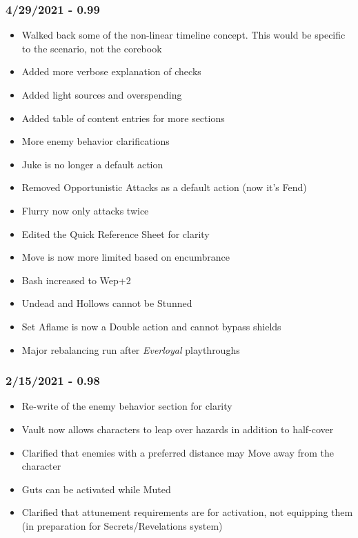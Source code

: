 \documentclass[12pt]{article}
\begin{document}
\begin{multicols*}{2}
\subsubsection*{4/29/2021 - 0.99}
\begin{itemize}
\item Walked back some of the non-linear timeline concept. This would be specific to the scenario, not the corebook
\item Added more verbose explanation of checks
\item Added light sources and overspending
\item Added table of content entries for more sections
\item More enemy behavior clarifications
\item Juke is no longer a default action
\item Removed Opportunistic Attacks as a default action (now it’s Fend)
\item Flurry now only attacks twice
\item Edited the Quick Reference Sheet for clarity
\item Move is now more limited based on encumbrance
\item Bash increased to Wep+2
\item Undead and Hollows cannot be Stunned
\item Set Aflame is now a Double action and cannot bypass shields
\item Major rebalancing run after \emph{Everloyal} playthroughs
\end{itemize}
\subsubsection*{2/15/2021 - 0.98}
\begin{itemize}
\item Re-write of the enemy behavior section for clarity
\item Vault now allows characters to leap over hazards in addition to half-cover
\item Clarified that enemies with a preferred distance may Move away from the character
\item Guts can be activated while Muted
\item Clarified that attunement requirements are for activation, not equipping them (in preparation for Secrets/Revelations system)
\end{itemize}

\end{multicols*}
\end{document}
